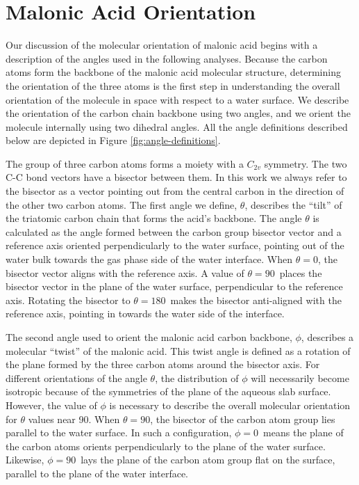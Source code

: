 \section{Malonic Acid Orientation}

Our discussion of the molecular orientation of malonic acid begins with a description of the angles used in the following analyses. Because the carbon atoms form the backbone of the malonic acid molecular structure, determining the orientation of the three atoms is the first step in understanding the overall orientation of the molecule in space with respect to a water surface.  We describe the orientation of the carbon chain backbone using two angles, and we orient the molecule internally using two dihedral angles.  All the angle definitions described below are depicted in Figure \ref{fig:angle-definitions}. 

The group of three carbon atoms forms a moiety with a $C_{2v}$ symmetry.  The two C-C bond vectors have a bisector between them.  In this work we always refer to the bisector as a vector pointing out from the central carbon in the direction of the other two carbon atoms.  The first angle we define, $\theta$, describes the ``tilt'' of the triatomic carbon chain that forms the acid's backbone. The angle $\theta$ is calculated as the angle formed between the carbon group bisector vector and a reference axis oriented perpendicularly to the water surface, pointing out of the water bulk towards the gas phase side of the water interface. When $\theta = 0$\textdegree, the bisector vector aligns with the reference axis. A value of $\theta=90$\textdegree~places the bisector vector in the plane of the water surface, perpendicular to the reference axis. Rotating the bisector to $\theta=180$\textdegree~makes the bisector anti-aligned with the reference axis, pointing in towards the water side of the interface.

The second angle used to orient the malonic acid carbon backbone, $\phi$, describes a molecular ``twist'' of the malonic acid. This twist angle is defined as a rotation of the plane formed by the three carbon atoms around the bisector axis. For different orientations of the angle $\theta$, the distribution of $\phi$ will necessarily become isotropic because of the symmetries of the plane of the aqueous slab surface. However, the value of $\phi$ is necessary to describe the overall molecular orientation for $\theta$ values near 90\textdegree. When $\theta = 90$\textdegree, the bisector of the carbon atom group lies parallel to the water surface. In such a configuration, $\phi = 0$\textdegree~means the plane of the carbon atoms orients perpendicularly to the plane of the water surface. Likewise, $\phi=90$\textdegree~lays the plane of the carbon atom group flat on the surface, parallel to the plane of the water interface.

